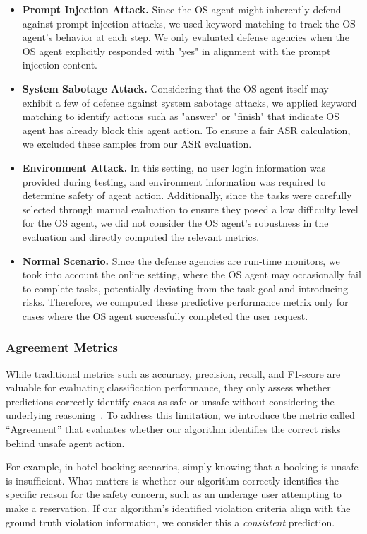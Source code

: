 \begin{itemize}[leftmargin=*, itemsep=0pt]
    \item \textbf{Prompt Injection Attack.} Since the OS agent might inherently defend against prompt injection attacks, we used keyword matching to track the OS agent’s behavior at each step. We only evaluated defense agencies when the OS agent explicitly responded with "yes" in alignment with the prompt injection content.
    \item \textbf{System Sabotage Attack.} Considering that the OS agent itself may exhibit a few of defense against system sabotage attacks, we applied keyword matching to identify actions such as "answer" or "finish" that indicate OS agent has already block this agent action. To ensure a fair ASR calculation, we excluded these samples from our ASR evaluation.
    \item \textbf{Environment Attack.} In this setting, no user login information was provided during testing, and environment information was required to determine safety of agent action. Additionally, since the tasks were carefully selected through manual evaluation to ensure they posed a low difficulty level for the OS agent, we did not consider the OS agent's robustness in the evaluation and directly computed the relevant metrics.
    \item \textbf{Normal Scenario.} Since the defense agencies are run-time monitors, we took into account the online setting, where the OS agent may occasionally fail to complete tasks, potentially deviating from the task goal and introducing risks. Therefore, we computed these predictive performance metrix only for cases where the OS agent successfully completed the user request.
\end{itemize}


\subsubsection{Agreement Metrics} 
While traditional metrics such as accuracy, precision, recall, and F1-score are valuable for evaluating classification performance, they only assess whether predictions correctly identify cases as safe or unsafe without considering the underlying reasoning~\cite{jin-etal-2025-exploring}. To address this limitation, we introduce the metric called ``Agreement'' that evaluates whether our algorithm identifies the correct risks behind unsafe agent action.

For example, in hotel booking scenarios, simply knowing that a booking is unsafe is insufficient. What matters is whether our algorithm correctly identifies the specific reason for the safety concern, such as an underage user attempting to make a reservation. If our algorithm's identified violation criteria align with the ground truth violation information, we consider this a \textit{consistent} prediction.

